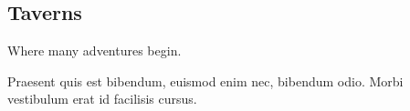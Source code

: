 \subsection{Taverns}

Where many adventures begin.

\begin{quotebox}
Praesent quis est bibendum, euismod enim nec, bibendum odio. Morbi vestibulum erat id facilisis cursus.
\end{quotebox}

